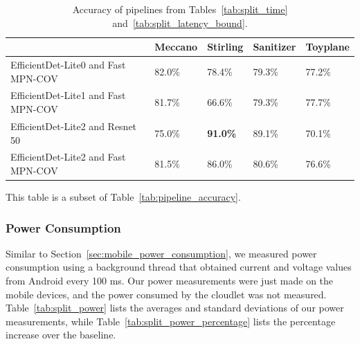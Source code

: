 \begin{table}
\begin{tabular}{|l||l|l|l|l|}
  \hline
  & Meccano & Stirling & Sanitizer & Toyplane\\
  \hline
  \hline
  EfficientDet-Lite0 and Fast MPN-COV & 82.0\% & 78.4\% & 79.3\% & 77.2\%\\
  EfficientDet-Lite1 and Fast MPN-COV & 81.7\% & 66.6\% & 79.3\% & 77.7\%\\
  EfficientDet-Lite2 and Resnet 50 & 75.0\% & \textbf{91.0\%} & 89.1\% & 70.1\%\\
  EfficientDet-Lite2 and Fast MPN-COV & 81.5\% & 86.0\% & 80.6\% & 76.6\%\\
  \hline
\end{tabular}
  \begin{captiontext}
    This table is a subset of Table~\ref{tab:pipeline_accuracy}.
  \end{captiontext}
  \caption{
    Accuracy of pipelines from Tables~\ref{tab:split_time}
    and~\ref{tab:split_latency_bound}.
  }\label{tab:split_pipeline_accuracy}
\end{table}

\subsubsection{Power Consumption}

Similar to Section~\ref{sec:mobile_power_consumption}, we measured power
consumption using a background thread that obtained current and voltage values
from Android every 100 ms.
Our power measurements were just made on the mobile devices, and the power
consumed by the cloudlet was not measured.
Table~\ref{tab:split_power} lists the averages and standard deviations of our
power measurements, while Table~\ref{tab:split_power_percentage} lists the
percentage increase over the baseline.

